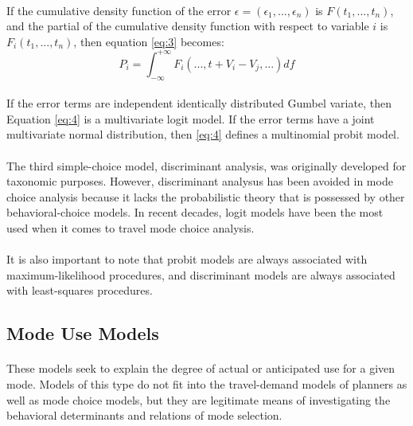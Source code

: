 \paragraph{}If the cumulative density function of the error $\epsilon =(\epsilon_1, . . . , \epsilon_n)$ is $F(t_1, . . . , t_n)$, and the partial of the cumulative density function with respect to variable $i$ is $F_i(t_1, . . . , t_n)$, then equation \ref{eq:3} becomes:
\begin{equation}\label{eq:4}
P_i = 	\int_{-\infty}^{+\infty} F_i(. . . , t + V_i - V_j, . . .)df
\end{equation}
\paragraph{}If the error terms are independent identically distributed Gumbel variate, then Equation \ref{eq:4} is a multivariate logit model. If the error terms have a joint multivariate normal distribution, then \ref{eq:4} defines a multinomial probit model. 
\paragraph{}The third simple-choice model, discriminant analysis, was originally developed for taxonomic purposes. However, discriminant analysus has been avoided in mode choice analysis because it lacks the probabilistic theory that is possessed by other behavioral-choice models. In recent decades, logit models have been the most used when it comes to travel mode choice analysis.
\paragraph{}It is also important to note that probit models are always associated with maximum-likelihood procedures, and discriminant models are always associated with least-squares procedures.

\subsection{Mode Use Models}
\paragraph{}These models seek to explain the degree of actual or anticipated use for a given mode. Models of this type do not fit into the travel-demand models of planners as well as mode choice models, but they are legitimate means of investigating the behavioral determinants and relations of mode selection.
